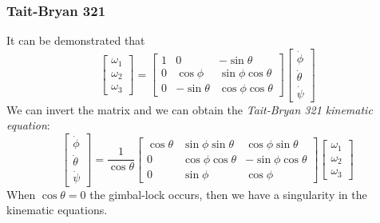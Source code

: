 \subsubsection{Tait-Bryan 321}
It can be demonstrated that
\begin{equation}
        \begin{bmatrix}
            \omega_1\\
            \omega_2\\
            \omega_3
        \end{bmatrix} = 
        \begin{bmatrix}
            1&0&-\sin\theta\\
            0&\cos\phi&\sin\phi\cos\theta\\
            0&-\sin\theta&\cos\phi\cos\theta
        \end{bmatrix}
        \begin{bmatrix}
            \dot{\phi}\\
            \dot{\theta}\\
            \dot{\psi}
        \end{bmatrix}
\end{equation}
We can invert the matrix and we can obtain the \textit{Tait-Bryan 321 kinematic equation}:
\begin{equation}
    \begin{bmatrix}
        \dot{\phi}\\
        \dot{\theta}\\
        \dot{\psi}
    \end{bmatrix}=\frac{1}{\cos\theta}\begin{bmatrix}
        \cos\theta&\sin\phi\sin\theta&\cos\phi\sin\theta\\
        0&\cos\phi\cos\theta&-\sin\phi\cos\theta\\
        0&\sin\phi&\cos\phi
    \end{bmatrix}\begin{bmatrix}
        \omega_1\\
        \omega_2\\
        \omega_3
    \end{bmatrix}
\end{equation}
When $\cos\theta=0$ the gimbal-lock occurs, then we have a singularity in the kinematic equations.

